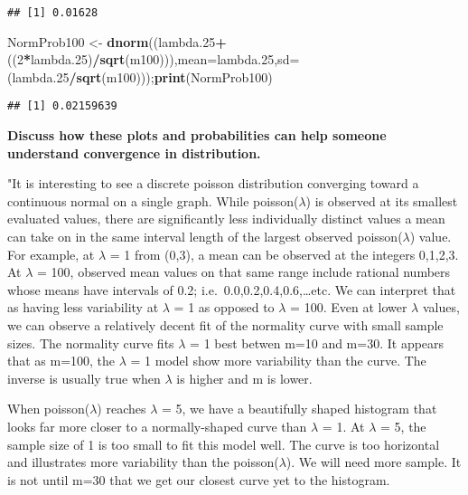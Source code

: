 \documentclass[
]{article}
\newenvironment{Shaded}{\begin{snugshade}}{\end{snugshade}}
\newcommand{\DataTypeTok}[1]{\textcolor[rgb]{0.13,0.29,0.53}{#1}}
\newcommand{\DecValTok}[1]{\textcolor[rgb]{0.00,0.00,0.81}{#1}}
\newcommand{\FloatTok}[1]{\textcolor[rgb]{0.00,0.00,0.81}{#1}}
\newcommand{\KeywordTok}[1]{\textcolor[rgb]{0.13,0.29,0.53}{\textbf{#1}}}
\newcommand{\NormalTok}[1]{#1}
\newcommand{\OperatorTok}[1]{\textcolor[rgb]{0.81,0.36,0.00}{\textbf{#1}}}
\newcommand{\StringTok}[1]{\textcolor[rgb]{0.31,0.60,0.02}{#1}}
\begin{document}
\begin{verbatim}
## [1] 0.01628
\end{verbatim}

\begin{Shaded}
\begin{Highlighting}[]
\NormalTok{NormProb100 <-}\StringTok{ }\KeywordTok{dnorm}\NormalTok{((lambda}\FloatTok{.25}\OperatorTok{+}\NormalTok{((}\DecValTok{2}\OperatorTok{*}\NormalTok{lambda}\FloatTok{.25}\NormalTok{)}\OperatorTok{/}\KeywordTok{sqrt}\NormalTok{(m100))),}\DataTypeTok{mean=}\NormalTok{lambda}\FloatTok{.25}\NormalTok{,}\DataTypeTok{sd=}\NormalTok{(lambda}\FloatTok{.25}\OperatorTok{/}\KeywordTok{sqrt}\NormalTok{(m100)));}\KeywordTok{print}\NormalTok{(NormProb100)}
\end{Highlighting}
\end{Shaded}

\begin{verbatim}
## [1] 0.02159639
\end{verbatim}

\textbf{Discuss how these plots and probabilities can help someone
understand convergence in distribution.}

"It is interesting to see a discrete poisson distribution converging
toward a continuous normal on a single graph. While poisson(\(\lambda\))
is observed at its smallest evaluated values, there are significantly
less individually distinct values a mean can take on in the same
interval length of the largest observed poisson(\(\lambda\)) value. For
example, at \(\lambda\) = 1 from (0,3), a mean can be observed at the
integers 0,1,2,3. At \(\lambda\) = 100, observed mean values on that
same range include rational numbers whose means have intervals of 0.2;
i.e.~0.0,0.2,0.4,0.6,\ldots etc. We can interpret that as having less
variability at \(\lambda\) = 1 as opposed to \(\lambda\) = 100. Even at
lower \(\lambda\) values, we can observe a relatively decent fit of the
normality curve with small sample sizes. The normality curve fits
\(\lambda\) = 1 best betwen m=10 and m=30. It appears that as m=100, the
\(\lambda\) = 1 model show more variability than the curve. The inverse
is usually true when \(\lambda\) is higher and m is lower.

When poisson(\(\lambda\)) reaches \(\lambda\) = 5, we have a beautifully
shaped histogram that looks far more closer to a normally-shaped curve
than \(\lambda\) = 1. At \(\lambda\) = 5, the sample size of 1 is too
small to fit this model well. The curve is too horizontal and
illustrates more variability than the poisson(\(\lambda\)). We will need
more sample. It is not until m=30 that we get our closest curve yet to
the histogram.
\end{document}
